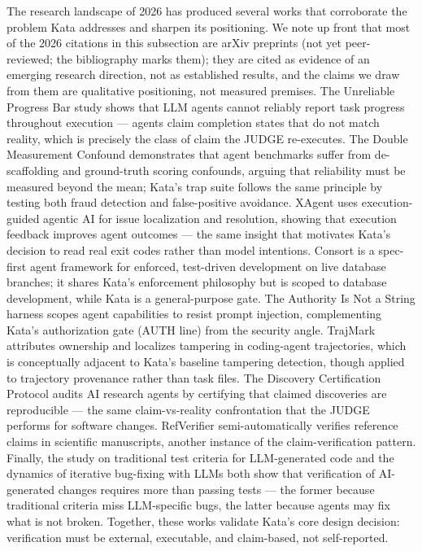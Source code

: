 \documentclass[11pt]{article}
\begin{document}
The research landscape of 2026 has produced several works that corroborate
the problem Kata addresses and sharpen its positioning. We note up front
that most of the 2026 citations in this subsection are arXiv preprints
(not yet peer-reviewed; the bibliography marks them); they are cited as
evidence of an emerging research direction, not as established results,
and the claims we draw from them are qualitative positioning, not
measured premises. The Unreliable
Progress Bar study \cite{unreliable-progress} shows that LLM agents cannot
reliably report task progress throughout execution --- agents claim
completion states that do not match reality, which is precisely the class of
claim the JUDGE re-executes. The Double Measurement Confound
\cite{double-measurement} demonstrates that agent benchmarks suffer from
de-scaffolding and ground-truth scoring confounds, arguing that reliability
must be measured beyond the mean; Kata's trap suite follows the same
principle by testing both fraud detection and false-positive avoidance.
XAgent \cite{xagent} uses execution-guided agentic AI for issue
localization and resolution, showing that execution feedback improves agent
outcomes --- the same insight that motivates Kata's decision to read real
exit codes rather than model intentions. Consort \cite{consort} is a
spec-first agent framework for enforced, test-driven development on live
database branches; it shares Kata's enforcement philosophy but is scoped to
database development, while Kata is a general-purpose gate. The Authority
Is Not a String harness \cite{authority-harness} scopes agent capabilities
to resist prompt injection, complementing Kata's authorization gate (AUTH
line) from the security angle. TrajMark \cite{trajmark} attributes ownership
and localizes tampering in coding-agent trajectories, which is conceptually
adjacent to Kata's baseline tampering detection, though applied to
trajectory provenance rather than task files. The Discovery Certification
Protocol \cite{discovery-certification} audits AI research agents by
certifying that claimed discoveries are reproducible --- the same
claim-vs-reality confrontation that the JUDGE performs for software
changes. RefVerifier \cite{refverifier} semi-automatically verifies
reference claims in scientific manuscripts, another instance of the
claim-verification pattern. Finally, the study on traditional test criteria
for LLM-generated code \cite{test-criteria-llm} and the dynamics of
iterative bug-fixing with LLMs \cite{not-buggy} both show that verification
of AI-generated changes requires more than passing tests --- the former
because traditional criteria miss LLM-specific bugs, the latter because
agents may fix what is not broken. Together, these works validate Kata's
core design decision: verification must be external, executable, and
claim-based, not self-reported.
\end{document}
